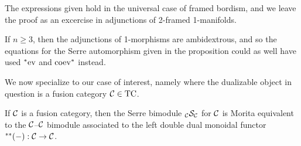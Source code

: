 \documentclass{amsart}
\begin{document}
The expressions given hold in the universal case of framed bordism, and we leave the proof as an excercise in adjunctions of 2-framed 1-manifolds.

\begin{remark}
If $n \geq 3$, then the adjunctions of 1-morphisms are ambidextrous, and so the equations for the Serre automorphism given in the proposition could as well have used ${}^*{\mathrm{ev}}$ and ${\mathrm{coev}}^*$ instead.
\end{remark}


We now specialize to our case of interest, namely where the dualizable object in question is a fusion category $\mathcal C \in \mathrm{TC}$.


\begin{theorem} \label{thm-serre}
If $\mathcal C$ is a fusion category, then the Serre bimodule ${}_{\mathcal C} {\mathcal S}_{\mathcal C}$ for $\mathcal C$ is Morita equivalent to the $\mathcal C$--$\mathcal C$ bimodule associated to the left double dual monoidal functor ${}^{**}{(-)}: \mathcal C \rightarrow \mathcal C$.
\end{theorem}
\end{document}
